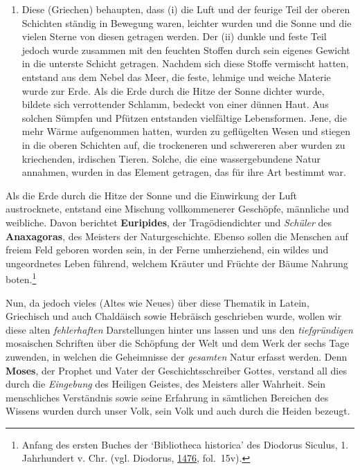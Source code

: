 \documentclass[
]{article}
\providecommand{\tightlist}{%
  \setlength{\itemsep}{0pt}\setlength{\parskip}{0pt}}
\begin{document}
\begin{enumerate}
\def\labelenumi{(\Roman{enumi})}
\tightlist
\item
  Diese (Griechen) behaupten, dass (i) die Luft und der feurige Teil der
  oberen Schichten ständig in Bewegung waren, leichter wurden und die
  Sonne und die vielen Sterne von diesen getragen werden. Der (ii)
  dunkle und feste Teil jedoch wurde zusammen mit den feuchten Stoffen
  durch sein eigenes Gewicht in die unterste Schicht getragen. Nachdem
  sich diese Stoffe vermischt hatten, entstand aus dem Nebel das Meer,
  die feste, lehmige und weiche Materie wurde zur Erde. Als die Erde
  durch die Hitze der Sonne dichter wurde, bildete sich verrottender
  Schlamm, bedeckt von einer dünnen Haut. Aus solchen Sümpfen und
  Pfützen entstanden vielfältige Lebensformen. Jene, die mehr Wärme
  aufgenommen hatten, wurden zu geflügelten Wesen und stiegen in die
  oberen Schichten auf, die trockeneren und schwereren aber wurden zu
  kriechenden, irdischen Tieren. Solche, die eine wassergebundene Natur
  annahmen, wurden in das Element getragen, das für ihre Art bestimmt
  war.
\end{enumerate}

Als die Erde durch die Hitze der Sonne und die Einwirkung der Luft
austrocknete, entstand eine Mischung vollkommenerer Geschöpfe, männliche
und weibliche. Davon berichtet \textbf{Euripides}, der Tragödiendichter
und \emph{Schüler} des \textbf{Anaxagoras}, des Meisters der
Naturgeschichte. Ebenso sollen die Menschen auf freiem Feld geboren
worden sein, in der Ferne umherziehend, ein wildes und ungeordnetes
Leben führend, welchem Kräuter und Früchte der Bäume Nahrung
boten.\footnote{Anfang des ersten Buches der `Bibliotheca historica' des
  Diodorus Siculus, 1. Jahrhundert v. Chr. (vgl. Diodorus,
  \href{https://doi.org/10.3931/e-rara-68988}{1476}, fol.~15v).}

Nun, da jedoch vieles (Altes wie Neues) über diese Thematik in Latein,
Griechisch und auch Chaldäisch sowie Hebräisch geschrieben wurde, wollen
wir diese alten \emph{fehlerhaften} Darstellungen hinter uns lassen und
uns den \emph{tiefgründigen} mosaischen Schriften über die Schöpfung der
Welt und dem Werk der sechs Tage zuwenden, in welchen die Geheimnisse
der \emph{gesamten} Natur erfasst werden. Denn \textbf{Moses}, der
Prophet und Vater der Geschichtsschreiber Gottes, verstand all dies
durch die \emph{Eingebung} des Heiligen Geistes, des Meisters aller
Wahrheit. Sein menschliches Verständnis sowie seine Erfahrung in
sämtlichen Bereichen des Wissens wurden durch unser Volk, sein Volk und
auch durch die Heiden bezeugt.
\end{document}
